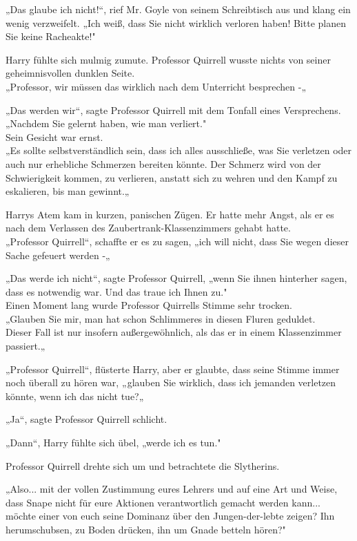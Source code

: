 {„Das glaube ich nicht!“, rief Mr. Goyle von seinem Schreibtisch aus und klang ein wenig verzweifelt. „Ich weiß, dass Sie nicht wirklich verloren haben! Bitte planen Sie keine Racheakte!"

Harry fühlte sich mulmig zumute. Professor Quirrell wusste nichts von seiner geheimnisvollen dunklen Seite.\\ „Professor, wir müssen das wirklich nach dem Unterricht besprechen -„

„Das werden wir“, sagte Professor Quirrell mit dem Tonfall eines Versprechens.\\ „Nachdem Sie gelernt haben, wie man verliert."\\ Sein Gesicht war ernst.\\ „Es sollte selbstverständlich sein, dass ich alles ausschließe, was Sie verletzen oder auch nur erhebliche Schmerzen bereiten könnte. Der Schmerz wird von der Schwierigkeit kommen, zu verlieren, anstatt sich zu wehren und den Kampf zu eskalieren, bis man gewinnt.„

Harrys Atem kam in kurzen, panischen Zügen. Er hatte mehr Angst, als er es nach dem Verlassen des Zaubertrank-Klassenzimmers gehabt hatte.\\ „Professor Quirrell“, schaffte er es zu sagen, „ich will nicht, dass Sie wegen dieser Sache gefeuert werden -„

„Das werde ich nicht“, sagte Professor Quirrell, „wenn Sie ihnen hinterher sagen, dass es notwendig war. Und das traue ich Ihnen zu."\\ Einen Moment lang wurde Professor Quirrells Stimme sehr trocken.\\ „Glauben Sie mir, man hat schon Schlimmeres in diesen Fluren geduldet.\\ Dieser Fall ist nur insofern außergewöhnlich, als das er in einem Klassenzimmer passiert.„

„Professor Quirrell“, flüsterte Harry, aber er glaubte, dass seine Stimme immer noch überall zu hören war, „glauben Sie wirklich, dass ich jemanden verletzen könnte, wenn ich das nicht tue?„

„Ja“, sagte Professor Quirrell schlicht.

„Dann“, Harry fühlte sich übel, „werde ich es tun."

Professor Quirrell drehte sich um und betrachtete die Slytherins.

„Also... mit der vollen Zustimmung eures Lehrers und auf eine Art und Weise, dass Snape nicht für eure Aktionen verantwortlich gemacht werden kann... möchte einer von euch seine Dominanz über den Jungen-der-lebte zeigen? Ihn herumschubsen, zu Boden drücken, ihn um Gnade betteln hören?"

}
